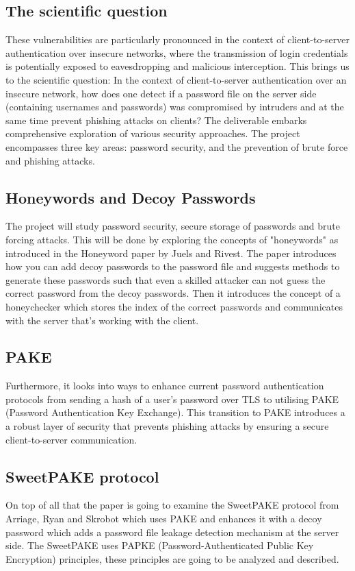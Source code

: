 \documentclass[conference,compsoc]{IEEEtran}
\begin{document}
\subsection{The scientific question} These vulnerabilities are particularly
pronounced in the context of client-to-server authentication over insecure
networks, where the transmission of login credentials is potentially exposed to
eavesdropping and malicious interception. This brings us to the scientific
question: In the context of client-to-server authentication over an insecure
network, how does one detect if a password file on the server side (containing
usernames and passwords) was compromised by intruders and at the same time
prevent phishing attacks on clients? The deliverable embarks comprehensive
exploration of various security approaches. The project encompasses three key
areas: password security, and the prevention of brute force and phishing
attacks.

\subsection{Honeywords and Decoy Passwords} The project will study password
security, secure storage of passwords and brute forcing attacks. This will be
done by exploring the concepts of "honeywords" as introduced in the Honeyword
paper \cite{juels2013honeywords} by Juels and Rivest. The paper introduces how you can add decoy
passwords to the password file and suggests methods to generate these passwords
such that even a skilled attacker can not guess the correct password from the
decoy passwords. Then it introduces the concept of a honeychecker which stores
the index of the correct passwords and communicates with the server that's
working with the client.

\subsection{PAKE} Furthermore, it looks into ways to enhance current password
authentication protocols from sending a hash of a user's password over TLS to
utilising PAKE (Password Authentication Key Exchange). This transition to PAKE
introduces a a robust layer of security that prevents phishing attacks by
ensuring a secure client-to-server communication. 

\subsection{SweetPAKE protocol} On top of all that the paper is going to
examine the SweetPAKE protocol from Arriage, Ryan and Skrobot \cite{sweetpake}
which uses PAKE and enhances it with a decoy password which adds a password
file leakage detection mechanism at the server side. The SweetPAKE uses PAPKE\cite{papke}
(Password-Authenticated Public Key Encryption) principles, these principles are
going to be analyzed and described.
\end{document}
